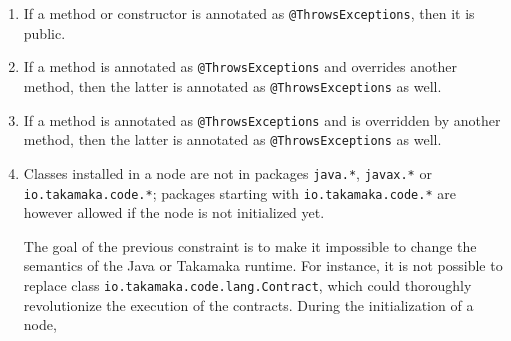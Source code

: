 \begin{enumerate}
\begin{commentbox}
For a more dangerous example, consider the following Java bytecode:
%
\begin{codebox}\begin{javalst}
10: goto 10
exception handler for java.lang.Exception: 10 11 10 // illegal in Takamaka
\end{javalst}\end{codebox}
%
This Java bytecode exception handler entails that any \texttt{OutOfGasException}
thrown by an instruction from line~10 (included) to line~11 (excluded)
redirects control to line~10. Hence, this code will exhaust the gas by looping at line~10.
Once all gas is consumed, an \texttt{OutOfGasException} is thrown, that is redirected
to line~10. Hence another \texttt{OutOfGasException} will occur, that redirects the
executor to line~10 again. And so on, for ever. That is, this code
disables the guarantee that Takamaka transactions always terminate,
possibly with an \texttt{OutOfGasException}. This code could be used for
a DOS attack to a Hotmoka node. Although this code cannot be written in Java,
it is well possible to write it directly, with a bytecode editor,
and submit it to a Hotmoka node, that will reject it, thanks to point~\ref{check:no_unchecked_exception_handlers}.
\end{commentbox}
%
\item If a method or constructor is annotated as \texttt{@ThrowsExceptions}, then it is public.
\item If a method is annotated as \texttt{@ThrowsExceptions} and overrides another method,
    then the latter is annotated as \texttt{@ThrowsExceptions} as well.
\item If a method is annotated as \texttt{@ThrowsExceptions} and is overridden by another method,
    then the latter is annotated as \texttt{@ThrowsExceptions} as well.
\item Classes installed in a node are not in packages \texttt{java.*}, \texttt{javax.*}
    or \texttt{io.takamaka.code.*}; packages starting with \texttt{io.takamaka.code.*} are
    however allowed if the node is not initialized yet.
%
\begin{commentbox}
The goal of the previous constraint is to make it impossible to change
the semantics of the Java or Takamaka runtime. For instance, it is not
possible to replace class \texttt{io.takamaka.code.lang.Contract}, which could thoroughly
revolutionize the execution of the contracts. During the initialization of a node,

\end{commentbox}
\end{enumerate}

